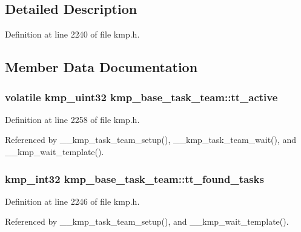 \subsection{Detailed Description}


Definition at line 2240 of file kmp.\-h.



\subsection{Member Data Documentation}
\hypertarget{structkmp__base__task__team_aa6e9a8311f759172e980d0f75bf81f7b}{
\subsubsection[{tt\-\_\-active}]{ volatile kmp\-\_\-uint32 kmp\-\_\-base\-\_\-task\-\_\-team\-::tt\-\_\-active}}\label{structkmp__base__task__team_aa6e9a8311f759172e980d0f75bf81f7b}


Definition at line 2258 of file kmp.\-h.



Referenced by \-\_\-\-\_\-kmp\-\_\-task\-\_\-team\-\_\-setup(), \-\_\-\-\_\-kmp\-\_\-task\-\_\-team\-\_\-wait(), and \-\_\-\-\_\-kmp\-\_\-wait\-\_\-template().

\hypertarget{structkmp__base__task__team_afb1c5ccacb58cdd0dd0895e4d535c120}{
\subsubsection[{tt\-\_\-found\-\_\-tasks}]{\setlength{\rightskip}{0pt plus 5cm}kmp\-\_\-int32 kmp\-\_\-base\-\_\-task\-\_\-team\-::tt\-\_\-found\-\_\-tasks}}\label{structkmp__base__task__team_afb1c5ccacb58cdd0dd0895e4d535c120}


Definition at line 2246 of file kmp.\-h.



Referenced by \-\_\-\-\_\-kmp\-\_\-task\-\_\-team\-\_\-setup(), and \-\_\-\-\_\-kmp\-\_\-wait\-\_\-template().

